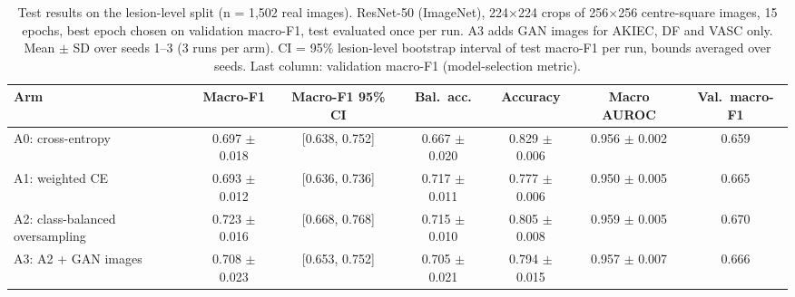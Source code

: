 \begin{table}[t]
\centering
\caption{Test results on the lesion-level split (n = 1,502 real images). ResNet-50 (ImageNet), 224$\times$224 crops of 256$\times$256 centre-square images, 15 epochs, best epoch chosen on validation macro-F1, test evaluated once per run. A3 adds GAN images for AKIEC, DF and VASC only. Mean $\pm$ SD over seeds 1--3 (3 runs per arm). CI = 95\% lesion-level bootstrap interval of test macro-F1 per run, bounds averaged over seeds. Last column: validation macro-F1 (model-selection metric).}
\label{tab:results}
\footnotesize
\setlength{\tabcolsep}{4pt}
\begin{tabular}{lcccccc}
\toprule
Arm & Macro-F1 & Macro-F1 95\% CI & Bal.\ acc. & Accuracy & Macro AUROC & Val.\ macro-F1 \\
\midrule
A0: cross-entropy & 0.697 $\pm$ 0.018 & [0.638, 0.752] & 0.667 $\pm$ 0.020 & 0.829 $\pm$ 0.006 & 0.956 $\pm$ 0.002 & 0.659 \\
A1: weighted CE & 0.693 $\pm$ 0.012 & [0.636, 0.736] & 0.717 $\pm$ 0.011 & 0.777 $\pm$ 0.006 & 0.950 $\pm$ 0.005 & 0.665 \\
A2: class-balanced oversampling & 0.723 $\pm$ 0.016 & [0.668, 0.768] & 0.715 $\pm$ 0.010 & 0.805 $\pm$ 0.008 & 0.959 $\pm$ 0.005 & 0.670 \\
A3: A2 + GAN images & 0.708 $\pm$ 0.023 & [0.653, 0.752] & 0.705 $\pm$ 0.021 & 0.794 $\pm$ 0.015 & 0.957 $\pm$ 0.007 & 0.666 \\
\bottomrule
\end{tabular}
\end{table}
